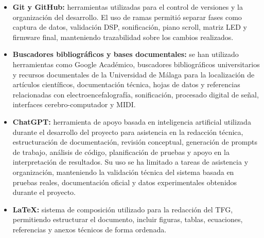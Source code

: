 \documentclass[../main.tex]{subfiles}
\begin{document}
\begin{itemize}
    \item \textbf{Git y GitHub:} herramientas utilizadas para el control de versiones y la organización del desarrollo. El uso de ramas permitió separar fases como captura de datos, validación DSP, sonificación, piano scroll, matriz LED y firmware final, manteniendo trazabilidad sobre los cambios realizados.

    \item \textbf{Buscadores bibliográficos y bases documentales:} se han utilizado herramientas como Google Académico, buscadores bibliográficos universitarios y recursos documentales de la Universidad de Málaga para la localización de artículos científicos, documentación técnica, hojas de datos y referencias relacionadas con electroencefalografía, sonificación, procesado digital de señal, interfaces cerebro-computador y MIDI.

    \item \textbf{ChatGPT:} herramienta de apoyo basada en inteligencia artificial utilizada durante el desarrollo del proyecto para asistencia en la redacción técnica, estructuración de documentación, revisión conceptual, generación de prompts de trabajo, análisis de código, planificación de pruebas y apoyo en la interpretación de resultados. Su uso se ha limitado a tareas de asistencia y organización, manteniendo la validación técnica del sistema basada en pruebas reales, documentación oficial y datos experimentales obtenidos durante el proyecto.

    \item \textbf{LaTeX:} sistema de composición utilizado para la redacción del TFG, permitiendo estructurar el documento, incluir figuras, tablas, ecuaciones, referencias y anexos técnicos de forma ordenada.

\end{itemize}
\end{document}
